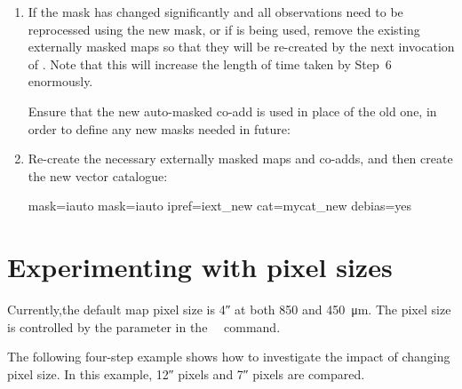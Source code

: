 \begin{enumerate}
\item If the mask has changed significantly and all observations need
  to be reprocessed using the new mask, or if  is being used,
  remove the existing externally masked maps so that they will be re-created by
  the next invocation of .  Note that this will increase the length of
  time taken by Step~6 enormously.

  Ensure that the new auto-masked co-add is used in place of the old one, in order to
  define any new masks needed in future:

\begin{terminalv}
\end{terminalv}

\item Re-create the necessary externally masked maps and co-adds, and
  then create the new vector catalogue:

\begin{terminalv}
     mask=iauto
     mask=iauto ipref=iext_new cat=mycat_new debias=yes
\end{terminalv}
\end{enumerate}


\section{Experimenting with pixel sizes}

Currently,the default map pixel size is 4\si{\arcsecond} at both
850 and \SI{450}{\micro\metre}. The pixel size is controlled by the
 parameter in the \smurf\ \poltwomap\ command.

\begin{terminalv}
\end{terminalv}


The following four-step example shows how to investigate the impact of
changing pixel size.  In this example, 12\si{\arcsecond}
pixels and 7\si{\arcsecond} pixels are compared.

